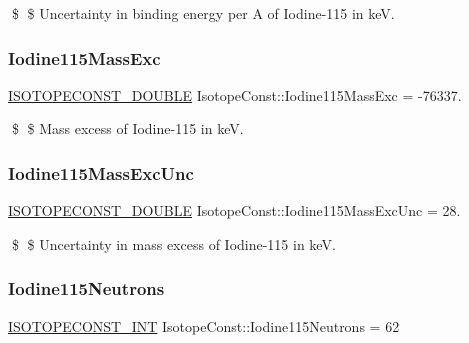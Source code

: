 \$ \$ Uncertainty in binding energy per A of Iodine-\/115 in keV. \mbox{\label{group___isotope_const-_iodine-_i115_gacd7df83443ee619b1f2c56f99ddbc199}} 
\subsubsection{\texorpdfstring{Iodine115\+Mass\+Exc}{Iodine115MassExc}}
{\footnotesize\ttfamily \mbox{\hyperlink{group___isotope_const-_macros_ga8f45a7272ce02c0b4c65c44636ed719a}{I\+S\+O\+T\+O\+P\+E\+C\+O\+N\+S\+T\+\_\+\+D\+O\+U\+B\+LE}} Isotope\+Const\+::\+Iodine115\+Mass\+Exc = -\/76337.}

\$ \$ Mass excess of Iodine-\/115 in keV. \mbox{\label{group___isotope_const-_iodine-_i115_ga0d7252a1df686c14dbeed114c53cf7d5}} 
\subsubsection{\texorpdfstring{Iodine115\+Mass\+Exc\+Unc}{Iodine115MassExcUnc}}
{\footnotesize\ttfamily \mbox{\hyperlink{group___isotope_const-_macros_ga8f45a7272ce02c0b4c65c44636ed719a}{I\+S\+O\+T\+O\+P\+E\+C\+O\+N\+S\+T\+\_\+\+D\+O\+U\+B\+LE}} Isotope\+Const\+::\+Iodine115\+Mass\+Exc\+Unc = 28.}

\$ \$ Uncertainty in mass excess of Iodine-\/115 in keV. \mbox{\label{group___isotope_const-_iodine-_i115_ga85639bcde86e9257caf097fc38db210d}} 
\subsubsection{\texorpdfstring{Iodine115\+Neutrons}{Iodine115Neutrons}}
{\footnotesize\ttfamily \mbox{\hyperlink{group___isotope_const-_macros_ga5f18360b3e99483a35c32d789e62621c}{I\+S\+O\+T\+O\+P\+E\+C\+O\+N\+S\+T\+\_\+\+I\+NT}} Isotope\+Const\+::\+Iodine115\+Neutrons = 62}

